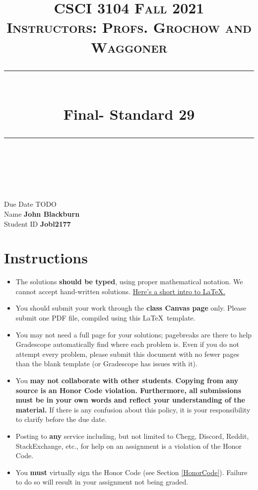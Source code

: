 \documentclass[11pt]{article}
\title{
\normalfont \normalsize 
\textsc{CSCI 3104 Fall 2021 \\ 
Instructors: Profs. Grochow and Waggoner} \\
[10pt] 
\rule{\linewidth}{0.5pt} \\[6pt] 
\huge Final- Standard 29 \\
\rule{\linewidth}{2pt}  \\[10pt]
}
\date{}
\theoremstyle{definition}
\theoremstyle{definition}
\theoremstyle{definition}
\begin{document}

\maketitle


\noindent
Due Date \dotfill TODO \\
Name \dotfill \textbf{John Blackburn} \\
Student ID \dotfill \textbf{Jobl2177} \\


\tableofcontents

\section{Instructions}
 \begin{itemize}
	\item The solutions \textbf{should be typed}, using proper mathematical notation. We cannot accept hand-written solutions. \href{http://ece.uprm.edu/~caceros/latex/introduction.pdf}{Here's a short intro to \LaTeX.}
	\item You should submit your work through the \textbf{class Canvas page} only. Please submit one PDF file, compiled using this \LaTeX \ template.
	\item You may not need a full page for your solutions; pagebreaks are there to help Gradescope automatically find where each problem is. Even if you do not attempt every problem, please submit this document with no fewer pages than the blank template (or Gradescope has issues with it).

	\item You \textbf{may not collaborate with other students}. \textbf{Copying from any source is an Honor Code violation. Furthermore, all submissions must be in your own words and reflect your understanding of the material.} If there is any confusion about this policy, it is your responsibility to clarify before the due date. 

	\item Posting to \textbf{any} service including, but not limited to Chegg, Discord, Reddit, StackExchange, etc., for help on an assignment is a violation of the Honor Code.

	\item You \textbf{must} virtually sign the Honor Code (see Section \ref{HonorCode}). Failure to do so will result in your assignment not being graded.
\end{itemize}
\end{document}
